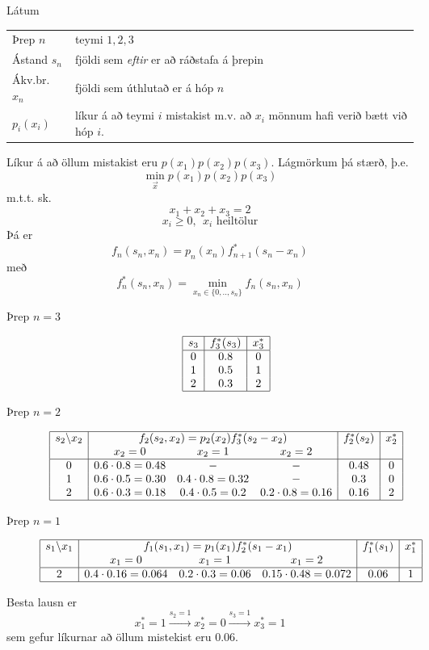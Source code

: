 \begin{lausn}Látum
\begin{center}\begin{tabular}{lp{7cm}}
  Þrep $n$ & teymi $1,2,3$ \\
  Ástand $s_n$ &  fjöldi sem \emph{eftir} er að ráðstafa á þrepin \\
  Ákv.br. $x_n$ & fjöldi sem úthlutað er á hóp $n$ \\
  $p_i(x_i)$ & líkur á að teymi $i$ mistakist m.v. að $x_i$ mönnum hafi verið bætt við hóp $i$.
\end{tabular}\end{center}
Líkur á að öllum mistakist eru $p(x_1)p(x_2)p(x_3)$. Lágmörkum þá stærð, þ.e.
  $$ \min_{\vec{x}} p(x_1)p(x_2)p(x_3)$$
m.t.t. sk. $$x_1+x_2+x_3=2$$ $$x_i\geq0,~~x_i\mbox{ heiltölur}$$
Þá er 
$$f_n(s_n,x_n)=p_n(x_n)f^*_{n+1}(s_n-x_n)$$
með
$$f_n^*(s_n,x_n)=\min_{x_n\in\{0,..,s_n\}}f_n(s_n,x_n)$$
  
\begin{description}
  \item[Þrep $n=3$]
{\scriptsize
  \[\begin{array}{|c|c|c|}\hline 
    s_3 & f_3^*(s_3) & x_3^* \\ \hline 
    0	& 0.8 & 0 \\
    1	& 0.5 & 1 \\
    2	& 0.3 & 2 \\    \hline
    \end{array}\]}
  \item[Þrep $n=2$]
{\scriptsize
  \[\begin{array}{|c|ccc|c|c|}\hline 
    s_2\backslash x_2 & \multicolumn{3}{c|}{f_2(s_2,x_2)=p_2(x_2)f^*_3(s_2-x_2)} &f_2^*(s_2)&  x_2^* \\ 
	& x_2=0	&	x_2=1	&	x_2=2	&	&	\\\hline 
    0	& 0.6\cdot0.8=0.48 	& - 	& - & 0.48&	0\\
    1	& 0.6\cdot0.5=0.30 	& 0.4\cdot0.8=0.32 	& - &0.3&	0\\    
    2	& 0.6\cdot0.3=0.18 	& 0.4\cdot0.5=0.2 	& 0.2\cdot0.8=0.16	&0.16&	2\\
    \hline
    \end{array}\]}
  \item[Þrep $n=1$]
{\scriptsize 
  \[\begin{array}{|c|ccc|c|c|}\hline 
    s_1\backslash x_1 & \multicolumn{3}{c|}{f_1(s_1,x_1)=p_1(x_1)f^*_2(s_1-x_1)} &f_1^*(s_1)&  x_1^* \\ 
	& x_1=0	&	x_1=1	&	x_1=2	&	&	\\\hline 
    2	& 0.4\cdot0.16=0.064 	& 0.2\cdot0.3=0.06 	& 0.15\cdot0.48=0.072	&0.06&	1\\
    \hline
    \end{array}\]}
\end{description}
Besta lausn er $$x_1^*=1\stackrel{s_2=1}{\longrightarrow}x_2^*=0\stackrel{s_3=1}{\longrightarrow}x_3^*=1$$ sem gefur líkurnar að öllum mistekist eru 0.06.

\end{lausn}
